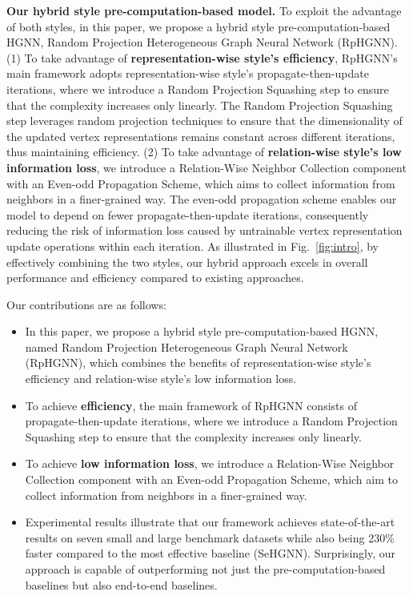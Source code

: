 \documentclass[lettersize,journal]{IEEEtran}
\begin{document}
\textbf{Our hybrid style pre-computation-based model.}
To exploit the advantage of both styles, in this paper, we propose a hybrid style pre-computation-based HGNN, Random Projection Heterogeneous Graph Neural Network (RpHGNN).
(1) To take advantage of \textbf{representation-wise style's efficiency}, RpHGNN's main framework adopts representation-wise style's propagate-then-update iterations, where we introduce a Random Projection Squashing step to ensure that the complexity increases only linearly.
The Random Projection Squashing step leverages random projection techniques to ensure that the dimensionality of the updated vertex representations remains constant across different iterations, thus maintaining efficiency.
(2) To take advantage of \textbf{relation-wise style's low information loss}, we introduce a Relation-Wise Neighbor Collection component with an Even-odd Propagation Scheme, which aims to collect information from
neighbors in a finer-grained way.
The even-odd propagation scheme enables our model to depend on fewer propagate-then-update iterations, consequently reducing the risk of information loss caused by untrainable vertex representation update operations within each iteration.
As illustrated in Fig.~\ref{fig:intro}, by effectively combining the two styles, our hybrid approach excels in overall performance and efficiency compared to existing approaches.










Our contributions are as follows:
\begin{itemize}
\item In this paper, we propose a hybrid style pre-computation-based HGNN, named Random Projection Heterogeneous Graph Neural Network (RpHGNN), which combines the benefits of representation-wise style's efficiency and relation-wise style's low information loss. 
\item To achieve \textbf{efficiency}, the main framework of RpHGNN consists of propagate-then-update iterations, where we introduce a Random Projection Squashing step to ensure that the complexity increases only linearly.
\item To achieve \textbf{low information loss}, we introduce a Relation-Wise Neighbor Collection component with an Even-odd Propagation Scheme, which aim to collect information from neighbors in a finer-grained way.
\item Experimental results illustrate that our framework achieves state-of-the-art results on seven small and large benchmark datasets while also being 230\% faster compared to the most effective baseline (SeHGNN).  
Surprisingly, our approach is capable of outperforming not just the pre-computation-based baselines but also end-to-end baselines.
\end{itemize}
\end{document}
